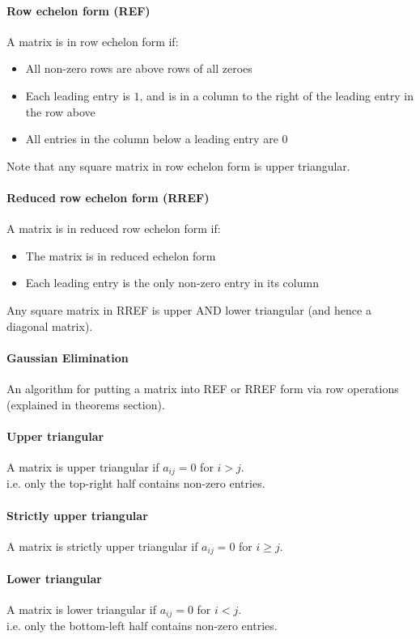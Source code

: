 \documentclass{scrartcl}
\begin{document}
\paragraph{Row echelon form (REF)}
A matrix is in row echelon form if:
\begin{itemize}
\item All non-zero rows are above rows of all zeroes
\item Each leading entry is $ 1 $, and is in a column to the right of the leading entry in the row above
\item All entries in the column below a leading entry are $ 0 $
\end{itemize}
Note that any square matrix in row echelon form is upper triangular.

\paragraph{Reduced row echelon form (RREF)}
A matrix is in reduced row echelon form if:
\begin{itemize}
\item The matrix is in reduced echelon form
\item Each leading entry is the only non-zero entry in its column
\end{itemize}
Any square matrix in RREF is upper AND lower triangular (and hence a diagonal matrix).

\paragraph{Gaussian Elimination}
An algorithm for putting a matrix into REF or RREF form via row operations (explained in theorems section).

\paragraph{Upper triangular}
A matrix is upper triangular if $ a_{ij} = 0 $ for $ i > j $.
\\
i.e. only the top-right half contains non-zero entries.

\paragraph{Strictly upper triangular}
A matrix is strictly upper triangular if $ a_{ij} = 0 $ for $ i \geq j $.

\paragraph{Lower triangular}
A matrix is lower triangular if $ a_{ij} = 0 $ for $ i < j $.
\\
i.e. only the bottom-left half contains non-zero entries.
\end{document}
